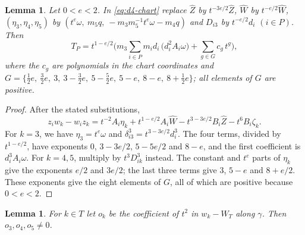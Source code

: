 \documentclass[Threeside,11pt]{article}
\newtheorem{lemma}[theorem]{Lemma}
\theoremstyle{definition}
\theoremstyle{remark}
\numberwithin{equation}{section}
\theoremstyle{remark}
\begin{document}
{\begin{lemma}\label{lem:d4-torque}
Let $0<e<2$.  In \eqref{eq:d4-chart} replace $\hat Z$ by $t^{-3e/2}\hat Z$, $\hat W$ by
$t^{-e/2}\hat W$, $(\eta_3,\eta_4,\eta_5)$ by $(t^e\omega,\ m_5q,\ -m_3m_5^{-1}t^e\omega-m_4q)$ and
$D_{i3}$ by $t^{-e/2}d_i$ $(i\in P)$.  Then
\[
  T_P=t^{1-e/2}\Big(m_3\sum_{i\in P}m_id_i\,\big(d_i^2A_i\omega\big)+\sum_{g\in G}c_g\,t^g\Big),
\]
where the $c_g$ are polynomials in the chart coordinates and
$G=\{\tfrac12e,\ \tfrac32e,\ 3,\ 3-\tfrac32e,\ 5-\tfrac52e,\ 5-e,\ 8-e,\ 8+\tfrac12e\}$; all
elements of $G$ are positive.
\end{lemma}
\begin{proof}
After the stated substitutions,
\[
 z_iw_k-w_iz_k
 =t^{-2}A_i\eta_k+t^{1-e/2}A_i\hat W
       -t^{3-3e/2}B_i\hat Z-t^6B_i\zeta_k.
\]
For $k=3$, we have $\eta_3=t^e\omega$ and
$\delta_{i3}^3=t^{3-3e/2}d_i^3$.  The four terms, divided by
$t^{1-e/2}$, have exponents
$0$, $3-3e/2$, $5-5e/2$ and $8-e$, and the first coefficient is
$d_i^3A_i\omega$.
For $k=4,5$, multiply by $t^3D_{ik}^3$ instead.  The constant and
$t^e$ parts of $\eta_k$ give the exponents $e/2$ and $3e/2$;
the last three terms give $3$, $5-e$ and $8+e/2$.
These exponents give the eight elements of $G$, all of which are positive
because $0<e<2$.
\end{proof}

}\begin{lemma}\label{lem:d4-central}
For $k\in T$ let $o_k$ be the coefficient of $t^2$ in $w_k-W_T$ along $\gamma$.  Then
$o_3,o_4,o_5\ne0$.
\end{lemma}
\end{document}
